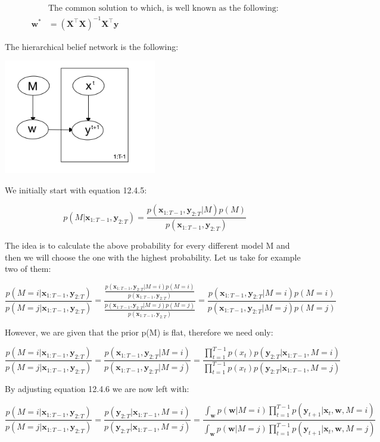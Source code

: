 \documentclass[11pt,a4paper,oneside]{report}
\begin{document}
\begin{align*}
&\text{The common solution to which, is well known as the following:}\\
\mathbf{w}^\ast&=(\mathbf{X}^\top\mathbf{X})^{-1}\mathbf{X}^\top\mathbf{y}
\end{align*}

The hierarchical belief network is the following:

	\begin{center} \includegraphics[width=0.5\textwidth]{c12e2beliefnetwork}\end{center}

We initially start with equation 12.4.5:

$$p(M|\mathbf{x}_{1:T-1},\mathbf{y}_{2:T})=\frac{p(\mathbf{x}_{1:T-1},\mathbf{y}_{2:T}|M)p(M)}{p(\mathbf{x}_{1:T-1},\mathbf{y}_{2:T})}$$

The idea is to calculate the above probability for every different model M and then we will choose the one with the highest probability. Let us take for example two of them:

$$\frac{p(M=i|\mathbf{x}_{1:T-1},\mathbf{y}_{2:T})}{p(M=j|\mathbf{x}_{1:T-1},\mathbf{y}_{2:T})}=\frac{\frac{p(\mathbf{x}_{1:T-1},\mathbf{y}_{2:T}|M=i)p(M=i)}{p(\mathbf{x}_{1:T-1},\mathbf{y}_{2:T})}}{\frac{p(\mathbf{x}_{1:T-1},\mathbf{y}_{2:T}|M=j)p(M=j)}{p(\mathbf{x}_{1:T-1},\mathbf{y}_{2:T})}}=\frac{p(\mathbf{x}_{1:T-1},\mathbf{y}_{2:T}|M=i)p(M=i)}{p(\mathbf{x}_{1:T-1},\mathbf{y}_{2:T}|M=j)p(M=j)}$$

However, we are given that the prior p(M) is flat, therefore we need only:

$$\frac{p(M=i|\mathbf{x}_{1:T-1},\mathbf{y}_{2:T})}{p(M=j|\mathbf{x}_{1:T-1},\mathbf{y}_{2:T})}=\frac{p(\mathbf{x}_{1:T-1},\mathbf{y}_{2:T}|M=i)}{p(\mathbf{x}_{1:T-1},\mathbf{y}_{2:T}|M=j)}=\frac{\prod_{t=1}^{T-1}p(x_t)p(\mathbf{y}_{2:T}|\mathbf{x}_{1:T-1},M=i)}{\prod_{t=1}^{T-1}p(x_t)p(\mathbf{y}_{2:T}|\mathbf{x}_{1:T-1},M=j)}$$

By adjusting equation 12.4.6 we are now left with:

$$\frac{p(M=i|\mathbf{x}_{1:T-1},\mathbf{y}_{2:T})}{p(M=j|\mathbf{x}_{1:T-1},\mathbf{y}_{2:T})}=\frac{p(\mathbf{y}_{2:T}|\mathbf{x}_{1:T-1},M=i)}{p(\mathbf{y}_{2:T}|\mathbf{x}_{1:T-1},M=j)}=\frac{\int_{\mathbf{w}}p(\mathbf{w}|M=i) \prod_{t=1}^{T-1}p(\mathbf{y}_{t+1}|\mathbf{x}_t,\mathbf{w},M=i)}{\int_{\mathbf{w}}p(\mathbf{w}|M=j) \prod_{t=1}^{T-1}p(\mathbf{y}_{t+1}|\mathbf{x}_t,\mathbf{w},M=j)}$$
\end{document}
